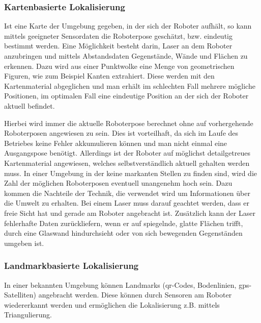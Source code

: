\subsubsection{Kartenbasierte Lokalisierung}


Ist eine Karte der Umgebung gegeben, in der sich der Roboter aufhält, so kann mittels geeigneter Sensordaten die Roboterpose geschätzt, bzw. eindeutig bestimmt werden. Eine Möglichkeit besteht darin, Laser an dem Roboter anzubringen und mittels Abstandsdaten Gegenstände, Wände und Flächen zu erkennen. Dazu wird aus einer Punktwolke eine Menge von geometrischen Figuren, wie zum Beispiel Kanten extrahiert. Diese werden mit den Kartenmaterial abgeglichen und man erhält im schlechten Fall mehrere mögliche Positionen, im optimalen Fall eine eindeutige Position an der sich der Roboter aktuell befindet.

Hierbei wird immer die aktuelle Roboterpose berechnet ohne auf vorhergehende Roboterposen angewiesen zu sein. Dies ist vorteilhaft, da sich im Laufe des Betriebes keine Fehler akkumulieren können und man nicht einmal eine Ausgangspose benötigt. Allerdings ist der Roboter auf möglichst detailgetreues Kartenmaterial angewiesen, welches selbstverständlich aktuell gehalten werden muss. In einer Umgebung in der keine markanten Stellen zu finden sind, wird die Zahl der möglichen Roboterposen eventuell unangenehm hoch sein. Dazu kommen die Nachteile der Technik, die verwendet wird um Informationen über die Umwelt zu erhalten. Bei einem Laser muss darauf geachtet werden, dass er freie Sicht hat und gerade am Roboter angebracht ist. Zusätzlich kann der Laser fehlerhafte Daten zurückliefern, wenn er auf spiegelnde, glatte Flächen trifft, durch eine Glaswand hindurchsieht oder von sich bewegenden Gegenständen umgeben ist.  

\subsubsection{Landmarkbasierte Lokalisierung}

In einer bekannten Umgebung können Landmarks (\gls{qr}-Codes, Bodenlinien,
 \gls{gps}-Satelliten) angebracht werden. Diese können durch Sensoren
 am Roboter wiedererkannt werden und ermöglichen die Lokalisierung
 z.B. mittels Triangulierung.

